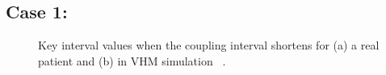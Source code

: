 \subsection{Case 1: }
\begin{figure}[!t]
\centering
\label{fig:Case_1}
\caption{\small Key interval values when the coupling interval shortens for (a) a real patient and (b) in VHM simulation ~\cite{vhm_ecrts10}.}
\end{figure} 




